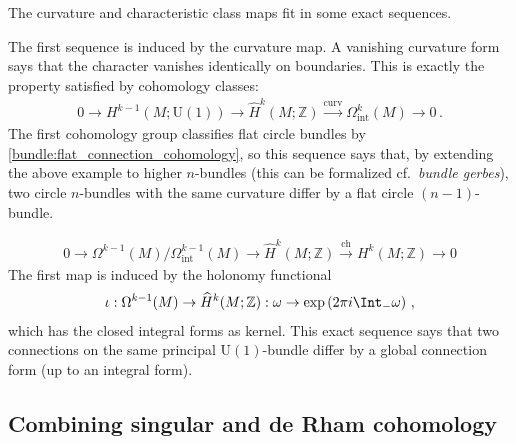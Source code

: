     The curvature and characteristic class maps fit in some exact sequences.
    \begin{property}
        The first sequence is induced by the curvature map. A vanishing curvature form says that the character vanishes identically on boundaries. This is exactly the property satisfied by cohomology classes:
        \begin{gather}
            0\longrightarrow H^{k-1}(M;\mathrm{U}(1))\longrightarrow\widehat{H}^k(M;\mathbb{Z})\overset{\mathrm{curv}}{\longrightarrow}\Omega^k_{\text{int}}(M)\longrightarrow0\,.
        \end{gather}
        The first cohomology group classifies flat circle bundles by \cref{bundle:flat_connection_cohomology}, so this sequence says that, by extending the above example to higher $n$-bundles (this can be formalized cf.~\textit{bundle gerbes}), two circle $n$-bundles with the same curvature differ by a flat circle $(n-1)$-bundle.
    \end{property}
    \begin{property}
        \begin{gather}
            0\longrightarrow \Omega^{k-1}(M)/\Omega^{k-1}_{\text{int}}(M)\longrightarrow\widehat{H}^k(M;\mathbb{Z})\overset{\mathrm{ch}}{\longrightarrow} H^k(M;\mathbb{Z})\longrightarrow0
        \end{gather}
        The first map is induced by the holonomy functional
        \begin{gather}
            \iota:\Omega^{k-1}(M)\rightarrow\widehat{H}^k(M;\mathbb{Z}):\omega\rightarrow\exp\left(2\pi i\Int_-\omega\right)\,,
        \end{gather}
        which has the closed integral forms as kernel. This exact sequence says that two connections on the same principal $\mathrm{U}(1)$-bundle differ by a global connection form (up to an integral form).
    \end{property}

\subsection{Combining singular and de Rham cohomology}

